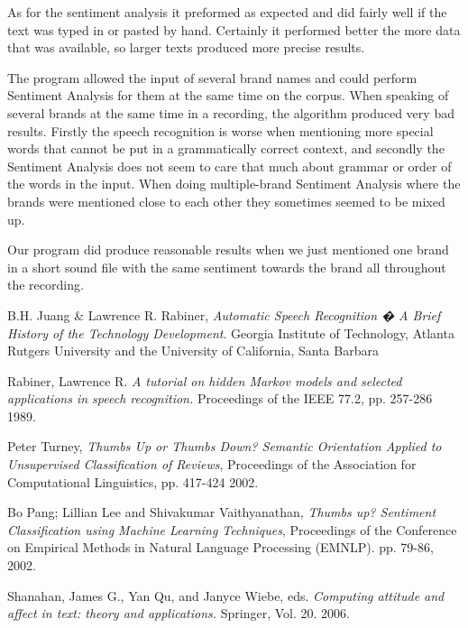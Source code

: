 \documentclass[a4paper,12pt,twoside]{ltxdoc}
\begin{document}
As for the sentiment analysis it preformed as expected and did fairly well if the text was typed in or pasted by hand. Certainly it performed better the more data that was available, so larger texts produced more precise results. 

The program allowed the input of several brand names and could perform Sentiment Analysis for them at the same time on the corpus. When speaking of several brands at the same time in a recording, the algorithm produced very bad results. Firstly the speech recognition is worse when mentioning more special words that cannot be put in a grammatically correct context, and secondly the Sentiment Analysis does not seem to care that much about grammar or order of the words in the input. When doing multiple-brand Sentiment Analysis where the brands were mentioned close to each other they sometimes seemed to be mixed up. 

Our program did produce reasonable results when we just mentioned one brand in a short sound file with the same sentiment towards the brand all throughout the recording. 

\newpage 

\begin{thebibliography}{9}
  
  B.H. Juang \& Lawrence R. Rabiner,
  \emph{Automatic Speech Recognition � A Brief History of the Technology Development}.
  Georgia Institute of Technology, Atlanta
  Rutgers University and the University of California, Santa Barbara
  
Rabiner, Lawrence R.
\emph{A tutorial on hidden Markov models and selected applications in speech recognition.}
Proceedings of the IEEE 77.2,
pp. 257-286
1989.

Peter Turney, 
\emph{Thumbs Up or Thumbs Down? Semantic Orientation Applied to Unsupervised Classification of Reviews},
 Proceedings of the Association for Computational Linguistics,
 pp. 417-424
 2002.

  Bo Pang; Lillian Lee and Shivakumar Vaithyanathan,
  \emph{Thumbs up? Sentiment Classification using Machine Learning Techniques},
  Proceedings of the Conference on Empirical Methods in Natural Language Processing (EMNLP).
  pp. 79-86,
  2002.

  Shanahan, James G., Yan Qu, and Janyce Wiebe, eds.
  \emph{Computing attitude and affect in text: theory and applications.}
  Springer, 
  Vol. 20.
  2006.

\end{thebibliography}
\end{document}
